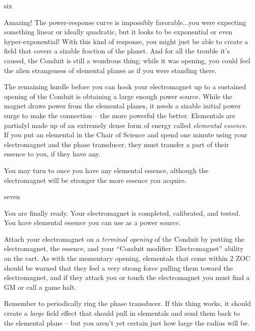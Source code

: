 \documentclass[notebook]{elementals}
\begin{document}
\begin{page}{six}

Amazing! The power-response curve is impossibly favorable...you were expecting something linear or ideally quadratic, but it looks to be exponential or even hyper-exponential! With this kind of response, you might just be able to create a field that covers a sizable fraction of the planet. And for all the trouble it's caused, the Conduit is still a wondrous thing; while it was opening, you could feel the alien strangeness of elemental planes as if you were standing there.

The remaining hurdle before you can hook your electromagnet up to a sustained opening of the Conduit is obtaining a large enough power source. While the magnet draws power from the elemental planes, it needs a sizable initial power surge to make the connection -- the more powerful the better. Elementals are partialyl made up of an extremely dense form of energy called \emph{elemental essence}. If you put an elemental in the Chair of Science and spend one minute using your electromagnet and the phase transducer, they must transfer a part of their essence to you, if they have any.

You may turn to  once you have any elemental essence, although the electromagnet will be stronger the more essence you acquire.

\end{page}

\begin{page}{seven}

You are finally ready. Your electromagnet is completed, calibrated, and tested. You have elemental essence you can use as a power source.

Attach your electromagnet on a \emph{terminal opening} of the Conduit by putting the electromagnet, the essence, and your ``Conduit modifier: Electromagnet'' ability on the cart. As with the momentary opening, elementals that come within 2 ZOC should be warned that they feel a very strong force pulling them toward the electromagnet, and if they attack you or touch the electromagnet you must find a GM or call a game halt.

Remember to periodically ring the phase transducer. If this thing works, it should create a \emph{large} field effect that should pull in elementals and send them back to the elemental plane -- but you aren't yet certain just how large the radius will be.

\end{page}

\endnotebook
\end{document}
